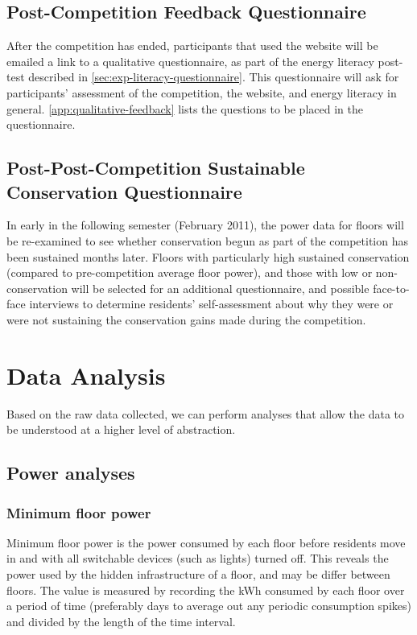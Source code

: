 
\subsection{Post-Competition Feedback Questionnaire}
\label{sec:post-competition-feedback}
After the competition has ended, participants that used the website will be emailed a link to a qualitative questionnaire, as part of the energy literacy post-test described in \ref{sec:exp-literacy-questionnaire}. This questionnaire will ask for participants' assessment of the competition, the website, and energy literacy in general. \autoref{app:qualitative-feedback} lists the questions to be placed in the questionnaire.

\subsection{Post-Post-Competition Sustainable Conservation Questionnaire}

In early in the following semester (February 2011), the power data for floors will be re-examined to see whether conservation begun as part of the competition has been sustained months later. Floors with particularly high sustained conservation (compared to pre-competition average floor power), and those with low or non-conservation will be selected for an additional questionnaire, and possible face-to-face interviews to determine residents' self-assessment about why they were or were not sustaining the conservation gains made during the competition.

\section{Data Analysis}

Based on the raw data collected, we can perform analyses that allow the data to be understood at a higher level of abstraction.

\subsection{Power analyses}

\subsubsection{Minimum floor power}
\label{sec:min-floor-power}
Minimum floor power is the power consumed by each floor before residents move in and with all switchable devices (such as lights) turned off. This reveals the power used by the hidden infrastructure of a floor, and may be differ between floors. The value is measured by recording the kWh consumed by each floor over a period of time (preferably days to average out any periodic consumption spikes) and divided by the length of the time interval.

